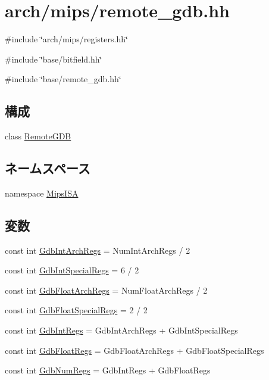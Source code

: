 \hypertarget{arch_2mips_2remote__gdb_8hh}{
\section{arch/mips/remote\_\-gdb.hh}
\label{arch_2mips_2remote__gdb_8hh}
}
{\ttfamily \#include \char`\"{}arch/mips/registers.hh\char`\"{}}\par
{\ttfamily \#include \char`\"{}base/bitfield.hh\char`\"{}}\par
{\ttfamily \#include \char`\"{}base/remote\_\-gdb.hh\char`\"{}}\par
\subsection*{構成}
\begin{DoxyCompactItemize}
\item 
class \hyperlink{classMipsISA_1_1RemoteGDB}{RemoteGDB}
\end{DoxyCompactItemize}
\subsection*{ネームスペース}
\begin{DoxyCompactItemize}
\item 
namespace \hyperlink{namespaceMipsISA}{MipsISA}
\end{DoxyCompactItemize}
\subsection*{変数}
\begin{DoxyCompactItemize}
\item 
const int \hyperlink{namespaceMipsISA_a4619f25a19f75050cec7dc07621b0599}{GdbIntArchRegs} = NumIntArchRegs / 2
\item 
const int \hyperlink{namespaceMipsISA_a3fdba04e31a7d07d44575f023cd6c344}{GdbIntSpecialRegs} = 6 / 2
\item 
const int \hyperlink{namespaceMipsISA_a5dec1bb388f2473cc5ae43e313d797eb}{GdbFloatArchRegs} = NumFloatArchRegs / 2
\item 
const int \hyperlink{namespaceMipsISA_af8dc5d46886267ca2c0eda8d7ef3acdc}{GdbFloatSpecialRegs} = 2 / 2
\item 
const int \hyperlink{namespaceMipsISA_a10a302d033444fc245bb517d13588869}{GdbIntRegs} = GdbIntArchRegs + GdbIntSpecialRegs
\item 
const int \hyperlink{namespaceMipsISA_a2cc3ae8e0cc393b8de3b4c2f3677bdd0}{GdbFloatRegs} = GdbFloatArchRegs + GdbFloatSpecialRegs
\item 
const int \hyperlink{namespaceMipsISA_a23ee23761a1a5c7317b01891fd58e85a}{GdbNumRegs} = GdbIntRegs + GdbFloatRegs
\end{DoxyCompactItemize}
